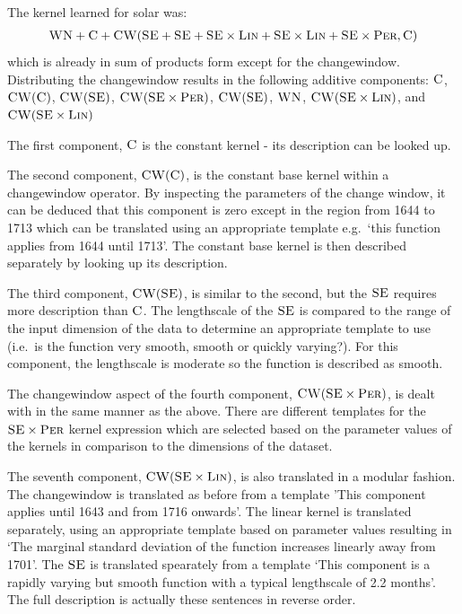 \documentclass{article}
\def\ie{i.e.\ }
\def\eg{e.g.\ }
\begin{document}

The kernel learned for solar was:
\begin{align*}
{\textsc{WN}} + {\textsc{C}} + {\textsc{CW}}({\textsc{SE}} + {\textsc{SE}} + {\textsc{SE}} \times {\textsc{Lin}}  + {\textsc{SE}} \times {\textsc{Lin}} + {\textsc{SE}} \times {\textsc{Per}}, {\textsc{C}})
\end{align*}
which is already in sum of products form except for the changewindow.
Distributing the changewindow results in the following additive components: ${\textsc{C}}$, ${\textsc{CW}}({\textsc{C}})$, ${\textsc{CW}}({\textsc{SE}})$, ${\textsc{CW}}({\textsc{SE}} \times {\textsc{Per}})$, ${\textsc{CW}}({\textsc{SE}})$, ${\textsc{WN}}$, ${\textsc{CW}}({\textsc{SE}} \times {\textsc{Lin}})$, and ${\textsc{CW}}({\textsc{SE}} \times {\textsc{Lin}})$

The first component, ${\textsc{C}}$ is the constant kernel - its description can be looked up.

The second component, ${\textsc{CW}}({\textsc{C}})$, is the constant base kernel within a changewindow operator.
By inspecting the parameters of the change window, it can be deduced that this component is zero except in the region from 1644 to 1713 which can be translated using an appropriate template \eg `this function applies from 1644 until 1713'.
The constant base kernel is then described separately by looking up its description.

The third component, ${\textsc{CW}}({\textsc{SE}})$, is similar to the second, but the ${\textsc{SE}}$ requires more description than ${\textsc{C}}$.
The lengthscale of the ${\textsc{SE}}$ is compared to the range of the input dimension of the data to determine an appropriate template to use (\ie is the function very smooth, smooth or quickly varying?).
For this component, the lengthscale is moderate so the function is described as smooth.

The changewindow aspect of the fourth component, ${\textsc{CW}}({\textsc{SE}} \times {\textsc{Per}})$, is dealt with in the same manner as the above.
There are different templates for the ${\textsc{SE}} \times {\textsc{Per}}$ kernel expression which are selected based on the parameter values of the kernels in comparison to the dimensions of the dataset.

The seventh component, ${\textsc{CW}}({\textsc{SE}} \times {\textsc{Lin}})$, is also translated in a modular fashion.
The changewindow is translated as before from a template 'This component
applies until 1643 and from 1716 onwards'.
The linear kernel is translated separately, using an appropriate template based on parameter values resulting in `The marginal standard deviation of the function increases linearly away from 1701'.
The ${\textsc{SE}}$ is translated spearately from a template `This component is a rapidly varying but smooth function with a typical lengthscale of 2.2 months'.
The full description is actually these sentences in reverse order.
\end{document}
